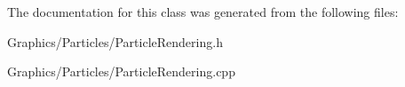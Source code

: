 The documentation for this class was generated from the following files\+:\begin{DoxyCompactItemize}
\item 
Graphics/\+Particles/Particle\+Rendering.\+h\item 
Graphics/\+Particles/Particle\+Rendering.\+cpp\end{DoxyCompactItemize}
